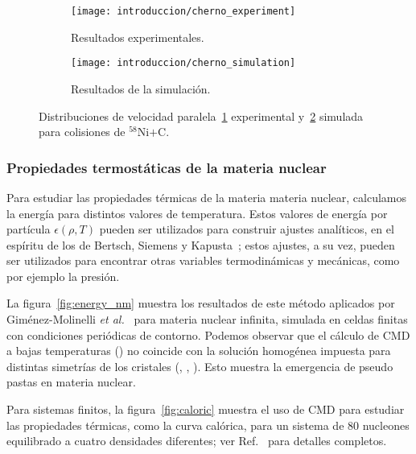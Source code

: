 \begin{figure}[h]
  \begin{subfigure}[h!]{0.48\columnwidth}
    \texttt{[image: introduccion/cherno\_experiment]}
    \caption{Resultados experimentales.}
    \label{sfig:exp}
  \end{subfigure}
  \begin{subfigure}[h!]{0.48\columnwidth}
    \texttt{[image: introduccion/cherno\_simulation]}
    \caption{Resultados de la simulación.}
    \label{sfig:sim}
  \end{subfigure}
  \centering
  \caption{Distribuciones de velocidad paralela~\ref{sfig:exp} experimental y~\ref{sfig:sim} simulada para colisiones de ${}^{58}\text{Ni+C}$.}
  \label{fig:distribution_vel}
\end{figure}


\subsubsection{Propiedades termostáticas de la materia nuclear}
Para estudiar las propiedades térmicas de la materia materia nuclear, calculamos la energía para distintos valores de temperatura.
Estos valores de energía por partícula $\epsilon(\rho,T)$ pueden ser utilizados para construir ajustes analíticos, en el espíritu de los de Bertsch, Siemens y Kapusta~\cite{bertsch_nuclear_1983, kapusta_deuteron_1984,
  lopez_nuclear_1984}; estos ajustes, a su vez, pueden ser utilizados para encontrar otras variables termodinámicas y mecánicas, como por ejemplo la presión.

La figura~\ref{fig:energy_nm} muestra los resultados de este método aplicados por Giménez-Molinelli \emph{et al.}~\cite{gimenez_molinelli_simulations_2014} para materia nuclear infinita, simulada en celdas finitas con condiciones periódicas de contorno.
Podemos observar que el cálculo de CMD a bajas temperaturas () no coincide con la solución homogénea impuesta para distintas simetrías de los cristales (, , ).
Esto muestra la emergencia de pseudo pastas en materia nuclear.

Para sistemas finitos, la figura~\ref{fig:caloric} muestra el uso de CMD para estudiar las propiedades térmicas, como la curva calórica, para un sistema de 80 nucleones equilibrado a cuatro densidades diferentes; ver Ref.~\cite{dorso_isoscaling_2011} para detalles completos.

